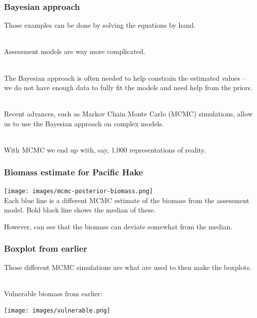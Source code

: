 
\begin{frame}
\frametitle{Bayesian approach}

Those examples can be done by solving the equations by hand.

~\\

Assessment models are way more complicated.

~\\

The Bayesian approach is often needed to help constrain the estimated values --
we do not have enough data to fully fit the models and need help from the priors.

~\\

Recent advances, such as Markov Chain Monte Carlo (MCMC) simulations, allow
us to use the Bayesian approach on complex models.

~\\

With MCMC we end up with, say, 1,000 representations of reality.
\end{frame}


\begin{frame}
\frametitle{Biomass estimate for Pacific Hake}

\texttt{[image: images/mcmc-posterior-biomass.png]}
\vspace{-10mm}\\
Each blue line is a different MCMC estimate of the biomass from the assessment model.
Bold black line shows the median of these.

However, can see that the biomass can deviate somewhat from the median.
\end{frame}


\begin{frame}
\frametitle{Boxplot from earlier}

Those different MCMC simulations are what are used to then make the boxplots.

~\\

Vulnerable biomass from earlier:

\centering
\texttt{[image: images/vulnerable.png]}

\end{frame}

